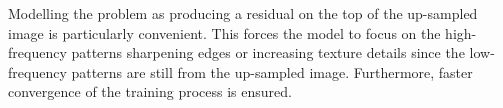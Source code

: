 Modelling the problem as producing a residual on the top of the up-sampled image is particularly convenient. This forces the model to focus on the high-frequency patterns sharpening edges or increasing texture details since the low-frequency patterns are still from the up-sampled image. Furthermore, faster convergence of the training process is ensured.
 





